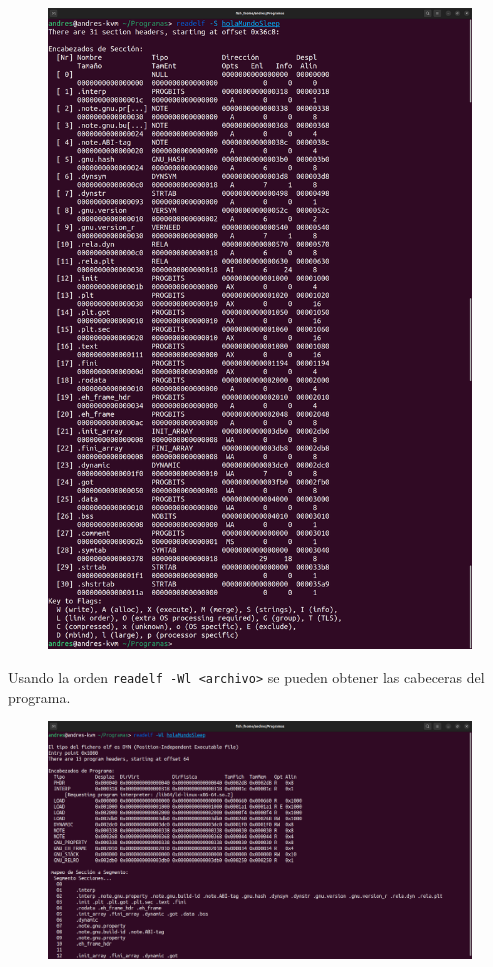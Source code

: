 \documentclass{article}
\begin{document}
\begin{figure}[H]
    \includegraphics[width=\textwidth]{imagenes/readelfSsleep.png}
\end{figure}

\newpage

Usando la orden \verb|readelf -Wl <archivo>| se pueden obtener las cabeceras del programa.

\begin{figure}[H]
    \includegraphics[width=\textwidth]{imagenes/Captura desde 2022-11-17 18-38-45.png}
\end{figure}
\end{document}
